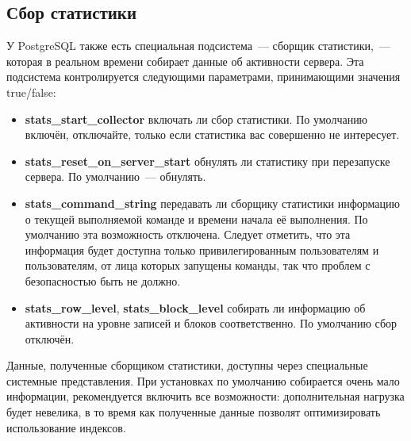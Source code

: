 \subsection{Сбор статистики}
У PostgreSQL также есть специальная подсистема~--- сборщик статистики,~--- которая в реальном времени собирает данные об 
активности сервера. Эта подсистема контролируется следующими параметрами, принимающими значения true/false:
\begin{itemize}
\item \textbf{stats\_start\_collector} включать ли сбор статистики. По умолчанию включён, отключайте, только если статистика вас 
совершенно не интересует.
\item \textbf{stats\_reset\_on\_server\_start} обнулять ли статистику при перезапуске сервера. По умолчанию~--- обнулять.
\item \textbf{stats\_command\_string} передавать ли сборщику статистики информацию о текущей выполняемой команде и времени 
начала её выполнения. По умолчанию эта возможность отключена. Следует отметить, что эта информация будет доступна только 
привилегированным пользователям и пользователям, от лица которых запущены команды, так что проблем с безопасностью быть не должно.
\item \textbf{stats\_row\_level}, \textbf{stats\_block\_level} собирать ли информацию об активности на уровне записей и 
блоков соответственно. По умолчанию сбор отключён.
\end{itemize}

Данные, полученные сборщиком статистики, доступны через специальные системные представления. При установках по умолчанию собирается 
очень мало информации, рекомендуется включить все возможности: дополнительная нагрузка будет невелика, в то время как полученные 
данные позволят оптимизировать использование индексов.